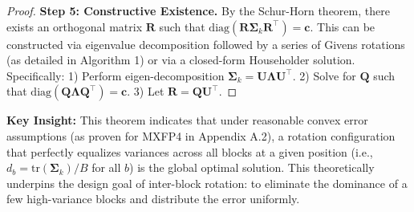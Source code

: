 \begin{proof}
\textbf{Step 5: Constructive Existence.}
By the Schur-Horn theorem, there exists an orthogonal matrix $\mathbf{R}$ such that $\mathrm{diag}(\mathbf{R} \boldsymbol{\Sigma}_k \mathbf{R}^\top) = \mathbf{c}$. This can be constructed via eigenvalue decomposition followed by a series of Givens rotations (as detailed in Algorithm 1) or via a closed-form Householder solution.
Specifically:
1) Perform eigen-decomposition $\boldsymbol{\Sigma}_k = \mathbf{U} \boldsymbol{\Lambda} \mathbf{U}^\top$.
2) Solve for $\mathbf{Q}$ such that $\mathrm{diag}(\mathbf{Q} \boldsymbol{\Lambda} \mathbf{Q}^\top) = \mathbf{c}$.
3) Let $\mathbf{R} = \mathbf{Q}\mathbf{U}^\top$.
\end{proof}

\textbf{Key Insight:} This theorem indicates that under reasonable convex error assumptions (as proven for MXFP4 in Appendix A.2), a rotation configuration that perfectly equalizes variances across all blocks at a given position (i.e., $d_b = \mathrm{tr}(\boldsymbol{\Sigma}_k)/B$ for all $b$) is the global optimal solution. This theoretically underpins the design goal of inter-block rotation: to eliminate the dominance of a few high-variance blocks and distribute the error uniformly.